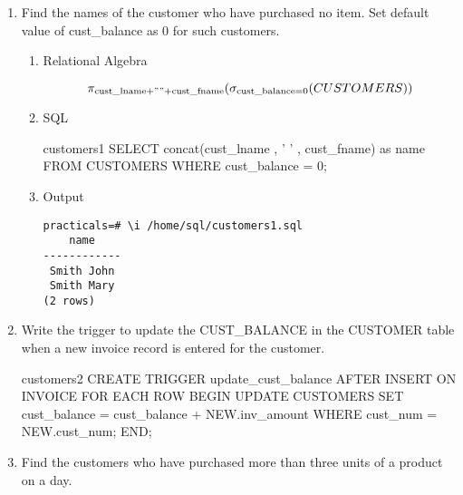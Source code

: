 \begin{enumerate}
	\item Find the names of the customer who have purchased no item. Set default value of cust\_balance as 0 for
	      such customers.

	      \begin{enumerate}
		      \item Relational Algebra

		            \begin{equation*}
			            \pi_{\text{cust\_lname} + " " + \text{cust\_fname}}(\sigma_{\text{cust\_balance} = 0} (CUSTOMERS))
		            \end{equation*}
		            \pagebreak

		      \item SQL

		            \begin{sqlQuery}{customers1}
                        SELECT concat(cust_lname , ' ' , cust_fname) as name
                        FROM CUSTOMERS
                        WHERE cust_balance = 0;
                    \end{sqlQuery}

		      \item Output

		            \begin{lstlisting}[style=output]
practicals=# \i /home/sql/customers1.sql
    name    
------------
 Smith John
 Smith Mary
(2 rows)
                    \end{lstlisting}

	      \end{enumerate}

	\item Write the trigger to update the \textsc{CUST\_BALANCE} in the CUSTOMER table when a new invoice record
	      is entered for the customer.


	      \begin{sqlQuery}{customers2}
                CREATE TRIGGER update_cust_balance
                AFTER INSERT ON INVOICE
                FOR EACH ROW
                BEGIN
                    UPDATE CUSTOMERS
                    SET cust_balance = cust_balance + NEW.inv_amount
                    WHERE cust_num = NEW.cust_num;
                END;
        \end{sqlQuery}


	\item Find the customers who have purchased more than three units of a product on a day.


\end{enumerate}
